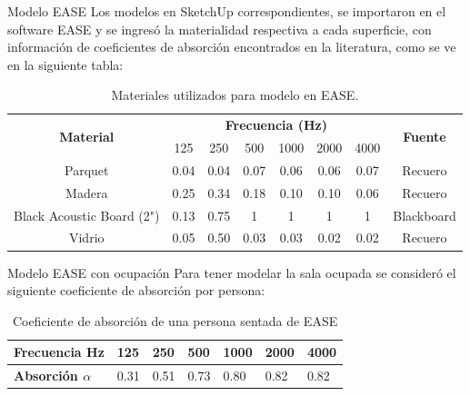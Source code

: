 \documentclass{sintefbeamer}
\begin{document}
\begin{frame}{Modelo EASE}
Los modelos en SketchUp correspondientes, se importaron en el software EASE y se ingresó la materialidad respectiva a cada superficie, con información de coeficientes de absorción encontrados en la literatura, como se ve en la siguiente tabla:
    \begin{table}[H]
        \centering
        \caption{Materiales utilizados para modelo en EASE.}
        \label{tab:materiales-ease}
        \begin{tabular}{|c|cccccc|c|}
        \hline
        \multirow{2}{*}{\textbf{Material}} & \multicolumn{6}{c|}{\textbf{Frecuencia (Hz)}}                                                                          & \multirow{2}{*}{\textbf{Fuente}} \\ \cline{2-7} 
                & \multicolumn{1}{c|}{125} & \multicolumn{1}{c|}{250} & \multicolumn{1}{c|}{500} & \multicolumn{1}{c|}{1000} & \multicolumn{1}{c|}{2000} & 4000 & \\ \hline
        Parquet & \multicolumn{1}{c|}{0.04} & \multicolumn{1}{c|}{0.04} & \multicolumn{1}{c|}{0.07} & \multicolumn{1}{c|}{0.06} & \multicolumn{1}{c|}{0.06} &  0.07 & Recuero\\ \hline
        Madera  & \multicolumn{1}{c|}{0.25} & \multicolumn{1}{c|}{0.34} & \multicolumn{1}{c|}{0.18} & \multicolumn{1}{c|}{0.10} & \multicolumn{1}{c|}{0.10} &  0.06 & Recuero\\  \hline
        Black Acoustic Board (2") & \multicolumn{1}{c|}{0.13} & \multicolumn{1}{c|}{0.75} & \multicolumn{1}{c|}{1} & \multicolumn{1}{c|}{1} & \multicolumn{1}{c|}{1} & 1 & Blackboard\\ \hline
        Vidrio  & \multicolumn{1}{c|}{0.05} & \multicolumn{1}{c|}{0.50} & \multicolumn{1}{c|}{0.03} & \multicolumn{1}{c|}{0.03} & \multicolumn{1}{c|}{0.02} & 0.02 & Recuero\\ \hline
        \end{tabular}
    \end{table}
\end{frame}
\begin{frame}{Modelo EASE con ocupación}
    \noindent Para tener modelar la sala ocupada se consideró el siguiente coeficiente de absorción por persona:
    \begin{table}[H]
        \centering
        \caption{Coeficiente de absorción de una persona sentada de EASE}
        \label{tab: coef abs persona}
        \begin{tabular}{|l|l|l|l|l|l|l|}
        \hline
        \textbf{Frecuencia Hz}      & 125  & 250  & 500  & 1000 & 2000 & 4000 \\ \hline
        \textbf{Absorción $\alpha$} & 0.31 & 0.51 & 0.73 & 0.80 & 0.82 & 0.82 \\ \hline
        \end{tabular}
    \end{table}
\end{frame}
\end{document}

